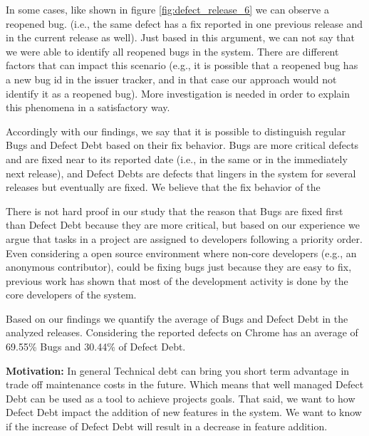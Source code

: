 In some cases, like shown in figure \ref{fig:defect_release_6} we can observe a reopened bug. (i.e., the same defect has a fix reported in one previous release and in the current release as well). Just based in this argument, we can not say that we were able to identify all reopened bugs in the system. There are different factors that can impact this scenario (e.g., it is possible that a reopened bug has a new bug id in the issuer tracker, and in that case our approach would not identify it as a reopened bug). More investigation is needed in order to explain this phenomena in a satisfactory way. 

Accordingly with our findings, we say that it is possible to distinguish regular Bugs and Defect Debt based on their fix behavior. Bugs are more critical defects and are fixed near to its reported date (i.e., in the same or in the immediately next release), and Defect Debts are defects that lingers in the system for several releases but eventually are fixed. We believe that the fix behavior of the 

There is not hard proof in our study that the reason that Bugs are fixed first than Defect Debt because they are more critical, but based on our experience we argue that tasks in a project are assigned to developers following a priority order. Even considering a open source environment where non-core developers (e.g., an anonymous contributor), could be fixing bugs just because they are easy to fix, previous work  has shown that most of the development activity is done by the core developers of the system.

Based on our findings we quantify the average of Bugs and Defect Debt in the analyzed releases. Considering the reported defects on Chrome has an average of 69.55\% Bugs and 30.44\% of Defect Debt.


\vspace{3mm}
\noindent\rqii
\vspace{3mm}

\noindent\textbf{Motivation:} In general Technical debt can bring you short term advantage in trade off maintenance costs in the future. Which means that well managed Defect Debt can be used as a tool to achieve projects goals. That said, we want to how Defect Debt impact the addition of new features in the system. We want to know if the increase of Defect Debt will result in a decrease in feature addition. 


